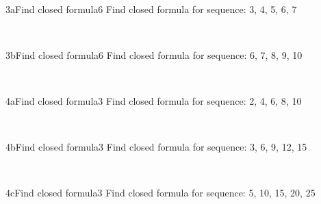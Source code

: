 \documentclass[a4paper,12pt]{book}
\begin{document}
    \newpage

    ~\\
    \begin{answersheetquestion}{3a}{Find closed formula}{6}
        Find closed formula for sequence: 3, 4, 5, 6, 7
        \iftoggle{answerkey}{ \begin{answer} $a_{n} = n+2$ \end{answer} }{ { ~\\ \raisebox{0pt}[2cm][0pt]{  } } }
    \end{answersheetquestion}

    ~\\
    \begin{answersheetquestion}{3b}{Find closed formula}{6}
        Find closed formula for sequence: 6, 7, 8, 9, 10
        \iftoggle{answerkey}{ \begin{answer} $a_{n} = n+5$ \end{answer} }{ { ~\\ \raisebox{0pt}[2cm][0pt]{  } } }
    \end{answersheetquestion}

    \hrulefill
    ~\\
    \begin{answersheetquestion}{4a}{Find closed formula}{3}
        Find closed formula for sequence: 2, 4, 6, 8, 10
        \iftoggle{answerkey}{ \begin{answer} $a_{n} = 2n$ \end{answer} }{ { ~\\ \raisebox{0pt}[2cm][0pt]{  } } }
    \end{answersheetquestion}

    ~\\
    \begin{answersheetquestion}{4b}{Find closed formula}{3}
        Find closed formula for sequence: 3, 6, 9, 12, 15
        \iftoggle{answerkey}{ \begin{answer} $a_{n} = 3n$ \end{answer} }{ { ~\\ \raisebox{0pt}[2cm][0pt]{  } } }
    \end{answersheetquestion}

    ~\\
    \begin{answersheetquestion}{4c}{Find closed formula}{3}
        Find closed formula for sequence: 5, 10, 15, 20, 25
        \iftoggle{answerkey}{ \begin{answer} $a_{n} = 5n$ \end{answer} }{ { ~\\ \raisebox{0pt}[2cm][0pt]{  } } }
    \end{answersheetquestion}
\end{document}
